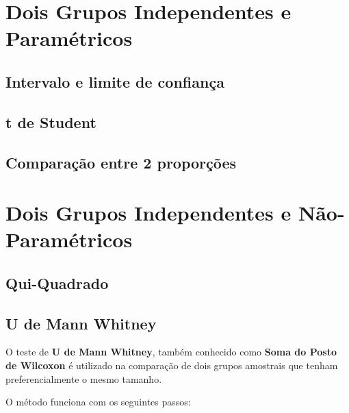 \documentclass[
]{book}
\begin{document}
\hypertarget{dois-grupos-independentes-e-paramuxe9tricos}{%
\chapter{Dois Grupos Independentes e Paramétricos}\label{dois-grupos-independentes-e-paramuxe9tricos}}

\hypertarget{intervalo-e-limite-de-confianuxe7a}{%
\section{Intervalo e limite de confiança}\label{intervalo-e-limite-de-confianuxe7a}}

\hypertarget{t-de-student-1}{%
\section{t de Student}\label{t-de-student-1}}

\hypertarget{comparauxe7uxe3o-entre-2-proporuxe7uxf5es}{%
\section{Comparação entre 2 proporções}\label{comparauxe7uxe3o-entre-2-proporuxe7uxf5es}}

\hypertarget{dois-grupos-independentes-e-nuxe3o-paramuxe9tricos}{%
\chapter{Dois Grupos Independentes e Não-Paramétricos}\label{dois-grupos-independentes-e-nuxe3o-paramuxe9tricos}}

\hypertarget{qui-quadrado}{%
\section{Qui-Quadrado}\label{qui-quadrado}}

\hypertarget{u-de-mann-whitney}{%
\section{U de Mann Whitney}\label{u-de-mann-whitney}}

O teste de \textbf{U de Mann Whitney}, também conhecido como \textbf{Soma do Posto de Wilcoxon} é utilizado na comparação de dois grupos amostrais que tenham preferencialmente o mesmo tamanho.

O método funciona com os seguintes passos:
\end{document}
